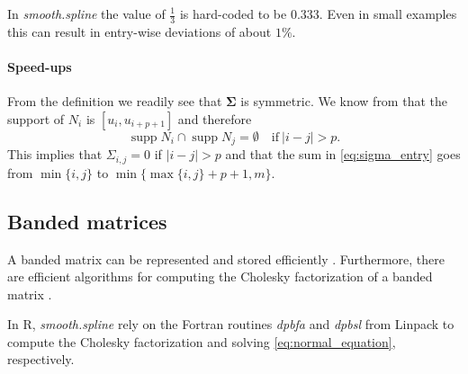 \documentclass[a4paper]{scrartcl}
\newcommand{\mat}[1]{\ensuremath{\bm{#1}}}
\DeclareMathOperator\supp{supp}
\begin{document}
In \textit{smooth.spline} the value of $\tfrac13$ is hard-coded to be $0.333$.
Even in small examples this can result in entry-wise deviations of about $1\%$.


\paragraph{Speed-ups}

From the definition we readily see that $\mat\Sigma$ is symmetric.
We know from \cite[P2.1]{Piegl:Tiller:1997} that the support of $N_i$ is $[u_i, u_{i+p+1}]$ and therefore 
\begin{equation*}
    \supp N_i \cap \supp N_j = \emptyset
    \quad\text{if}\:
    |i - j| > p.
\end{equation*}
This implies that $\Sigma_{i,j} = 0$ if $|i - j| > p$ and that the sum in \cref{eq:sigma_entry} goes from $\min\{i, j\}$ to $\min\{\max\{i, j\} + p + 1, m\}$.


\subsection{Banded matrices}

A banded matrix can be represented and stored efficiently \cite[Section 1.2.5]{Golub:van_Loan:2013}.
Furthermore, there are efficient algorithms for computing the Cholesky factorization of a banded matrix \cite[Section 4.3]{Golub:van_Loan:2013}.

In R, \textit{smooth.spline} rely on the Fortran routines \textit{dpbfa} and \textit{dpbsl} from Linpack \cite{Dongarra:Moler:Bunch:Stewart:1979} to compute the Cholesky factorization and solving \cref{eq:normal_equation}, respectively.


\printbibliography
\end{document}
